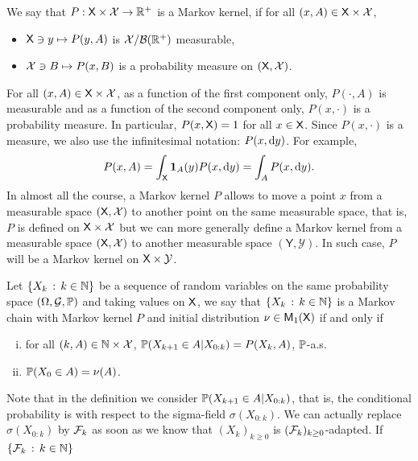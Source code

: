 \documentclass[english,graybox,envcountchap,envcountsame,sectrefs,shortlabels]{svmono}
\theoremstyle{style}
\newcommand{\Yset}{\mathsf{Y}}
\newcommand{\Ysigma}{\mathcal{Y}}
\newcommand{\bs}{\begin{shaded}}
\newcommand{\es}{\end{shaded}}
\newcommand{\eqsp}{}
\begin{document}
\begin{definition}
We say that $P:\mathsf{X}\times\mathcal{X}\to\mathbb{R}^{+}$
is a Markov kernel, if for all $(x,A)\in\mathsf{X}\times\mathcal{X}$,
\begin{itemize}
\item $\mathsf{X}\ni y\mapsto P(y,A)$ is $\mathcal{X}/\mathcal{B}(\mathbb{R}^{+})$ measurable,
\item $\mathcal{X}\ni B\mapsto P(x,B)$ is a probability measure on $(\mathsf{X},\mathcal{X})$.
\end{itemize}
\end{definition}
For all $(x,A)\in\mathsf{X}\times\mathcal{X}$, as a function
of the first component only, $P(\cdot,A)$ is measurable and as a
function of the second component only, $P(x,\cdot)$ is a probability
measure. In particular, $P(x,\mathsf{X})=1$ for all $x\in\mathsf{X}$. Since
$P(x,\cdot)$ is a measure, we also use the infinitesimal notation:
$P(x,\mathrm{d} y)$. For example, 
$$
P(x,A)=\int_{\Xset}\indi A(y)P(x,\rmd y)=\int_{A}P(x,\rmd y)\eqsp.
$$
In almost all the course, a Markov kernel $P$ allows to move a point $x$ from a measurable space $(\mathsf{X},\mathcal{X})$ to another point on the same measurable space, that is, $P$ is defined on $\mathsf{X}\times \mathcal{X}$ but we can more generally define a Markov kernel from a measurable space $(\mathsf{X},\mathcal{X})$ to another measurable space $(\Yset,\Ysigma)$. In such case, $P$ will be a  Markov kernel on $\Xset \times \Ysigma$. 
\begin{definition}
\label{def:MarkovChain} Let $\left\{ X_{k}\,:\,k\in\mathbb{N}\right\}$
be a sequence of random variables on the same probability space $(\Omega,\mathcal{G},\mathbb{P})$
and taking values on $\mathsf{X}$, we say that $\left\{ X_{k}\,:\,k\in\mathbb{N}\right\}$
is a Markov chain with Markov kernel $P$ and initial distribution
$\nu\in\mathsf{M}_{1}(\mathsf{X})$ if and only if
\begin{enumerate}[(i)]
\item  for all $(k,A)\in\mathbb{N}\times\mathcal{X}$,  $\mathbb{P}(X_{k+1}\in A|X_{0:k})=P(X_{k},A)$,
$\mathbb{P}$-a.s.
\item $\mathbb{P}(X_{0}\in A)=\nu(A)$.
\end{enumerate}
\end{definition}
Note that in the definition we consider $\mathbb{P}(X_{k+1}\in A|X_{0:k})$,
that is, the conditional probability is with respect to the sigma-field
$\sigma(X_{0:k})$. We can actually replace $\sigma(X_{0:k})$ by
$\mathcal{F}_{k}$ as soon as we know that $(X_{k})_{k\geq0}$ is $(\mathcal{F}_{k})_{k\geq0}$-adapted. If $\left\{ \mathcal{F}_{k}\,:\,k\in\mathbb{N}\right\}$
\end{document}
